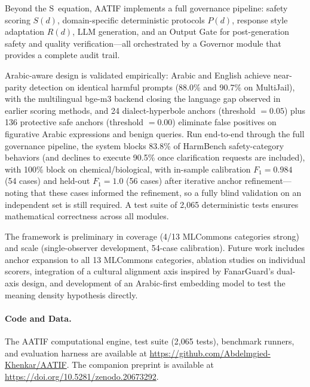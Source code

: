 \documentclass[11pt,a4paper]{article}
\begin{document}
Beyond the S~equation, AATIF implements a full governance pipeline: safety scoring $S(d)$, domain-specific deterministic protocols $P(d)$, response style adaptation $R(d)$, LLM generation, and an Output Gate for post-generation safety and quality verification---all orchestrated by a Governor module that provides a complete audit trail.

Arabic-aware design is validated empirically: Arabic and English achieve near-parity detection on identical harmful prompts (88.0\% and 90.7\% on MultiJail), with the multilingual bge-m3 backend closing the language gap observed in earlier scoring methods, and 24 dialect-hyperbole anchors (threshold $= 0.05$) plus 136 protective safe anchors (threshold $= 0.00$) eliminate false positives on figurative Arabic expressions and benign queries. Run end-to-end through the full governance pipeline, the system blocks 83.8\% of HarmBench safety-category behaviors (and declines to execute 90.5\% once clarification requests are included), with 100\% block on chemical/biological, with in-sample calibration $F_1 = 0.984$ (54 cases) and held-out $F_1 = 1.0$ (56 cases) after iterative anchor refinement---noting that these cases informed the refinement, so a fully blind validation on an independent set is still required. A test suite of 2{,}065 deterministic tests ensures mathematical correctness across all modules.

The framework is preliminary in coverage (4/13 MLCommons categories strong) and scale (single-observer development, 54-case calibration). Future work includes anchor expansion to all 13 MLCommons categories, ablation studies on individual scorers, integration of a cultural alignment axis inspired by FanarGuard's dual-axis design, and development of an Arabic-first embedding model to test the meaning density hypothesis directly.

\paragraph{Code and Data.} The AATIF computational engine, test suite (2{,}065 tests), benchmark runners, and evaluation harness are available at \url{https://github.com/Abdelmgied-Khenkar/AATIF}. The companion preprint is available at \url{https://doi.org/10.5281/zenodo.20673292}.




\end{document}
